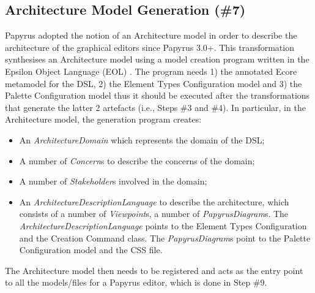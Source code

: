 \subsection{Architecture Model Generation (\#7)}
\label{sec:architectureModel}
Papyrus adopted the notion of an Architecture model in order to describe the architecture of the graphical editors since Papyrus 3.0+.
This transformation synthesises an Architecture model using a model creation program written in the Epsilon Object Language (EOL) \cite{kolovos2006epsilon}. 
The program needs 1) the annotated Ecore metamodel for the DSL, 2) the Element Types Configuration model and 3) the Palette Configuration model thus it should be executed after the transformations that generate the latter 2 artefacts (i.e., Steps \#3 and \#4).
In particular, in the Architecture model, the generation program creates:
\begin{itemize}
	\item An \textit{ArchitectureDomain} which represents the domain of the DSL;
	\item A number of \textit{Concern}s to describe the concerns of the domain;
	\item A number of \textit{Stakeholder}s involved in the domain;
	\item An \textit{ArchitectureDescriptionLanguage} to describe the architecture, which consists of a number of \textit{Viewpoint}s, a number of \textit{PapyrusDiagram}s. 
	The \textit{ArchitectureDescriptionLanguage} points to the Element Types Configuration and the Creation Command class. 
	The \textit{PapyrusDiagram}s point to the Palette Configuration model and the CSS file.
\end{itemize}

The Architecture model then needs to be registered and acts as the entry point to all the models/files for a Papyrus editor, which is done in Step \#9.


